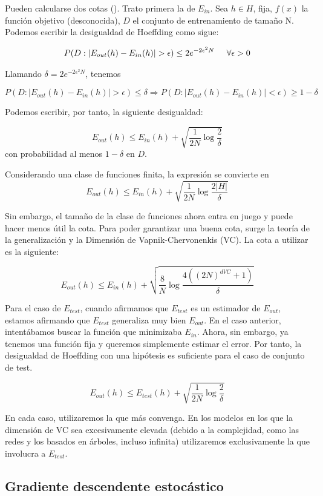 	
Pueden calcularse dos cotas (\cite{lfd}). Trato primera la de $E_{in}$. 
Sea $h \in H$, fija, $f(x)$ la función objetivo (desconocida), $D$ el conjunto de entrenamiento de tamaño N. Podemos escribir la desigualdad de Hoeffding como sigue:

$$P(D: |E_{out}(h)-E_{in}(h)|> \epsilon) \leq 2 e^{-2\epsilon^2N} \hspace{0.5cm} \forall \epsilon > 0$$

Llamando $\delta = 2e^{-2\epsilon^2 N}$, tenemos

$$P(D: |E_{out}(h)-E_{in}(h)|> \epsilon) \leq \delta \Rightarrow P(D: |E_{out}(h)-E_{in}(h)| < \epsilon) \geq 1 - \delta$$

Podemos escribir, por tanto, la siguiente desigualdad:

$$E_{out}(h) \leq E_{in}(h) + \sqrt{\frac{1}{2N} \log \frac{2}{\delta}}$$
con probabilidad al menos $1-\delta$ en $D$.

Considerando una clase de funciones finita, la expresión se convierte en 
$$E_{out}(h) \leq E_{in}(h) + \sqrt{\frac{1}{2N} \log \frac{2|H|}{\delta}}$$

Sin embargo, el tamaño de la clase de funciones ahora entra en juego y puede hacer menos útil la cota. Para poder garantizar una buena cota, surge la teoría de la generalización y la Dimensión de Vapnik-Chervonenkis (VC). La cota a utilizar es la siguiente:

$$E_{out}(h) \leq E_{in}(h) + \sqrt{\frac{8}{N} \log \frac{4((2N)^{d {VC}}+1)}{\delta}}$$


Para el caso de $E_{test}$, cuando afirmamos que $E_{test}$ es un estimador de $E_{out}$, estamos afirmando que $E_{test}$ generaliza muy bien $E_{out}$. En el caso anterior, intentábamos buscar la función que minimizaba $E_{in}$. Ahora, sin embargo, ya tenemos una función fija y queremos simplemente estimar el error. Por tanto, la desigualdad de Hoeffding con una hipótesis es suficiente para el caso de conjunto de test. 

$$E_{out}(h) \leq E_{test}(h) + \sqrt{\frac{1}{2N} \log \frac{2}{\delta}}$$

En cada caso, utilizaremos la que más convenga. En los modelos en los que la dimensión de VC sea excesivamente elevada (debido a la complejidad, como las redes y los basados en árboles, incluso infinita) utilizaremos exclusivamente la que involucra a $E_{test}$.

\subsection{Gradiente descendente estocástico}


